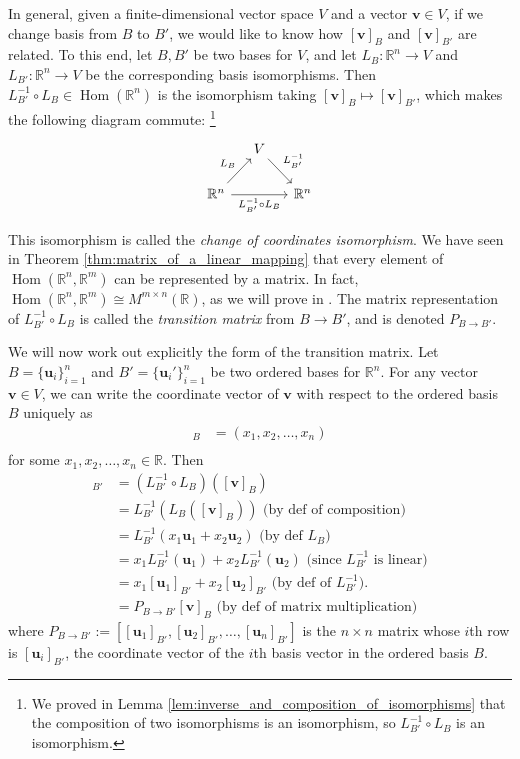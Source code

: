 \documentclass[12pt,letterpaper,reqno]{article}
\numberwithin{equation}{section}
\newcommand{\R}{\ensuremath{\mathbb R}}
\newcommand{\bv}{\mathbf{v}}
\newcommand{\bu}{\mathbf{u}}
\DeclareMathOperator{\Hom}{Hom}
\newcommand{\fixme}[1]{{\color{orange}{[#1]}}}
\begin{document}
In general, given a finite-dimensional vector space $V$ and a vector $\mathbf{v} \in V$, if we change basis from $B$ to $B'$, we would like to know how $[\mathbf{v}]_B$ and $[\mathbf{v}]_{B'}$ are related. To this end, let $B,B'$ be two bases for $V$, and let $L_B:\R^n \to V$ and $L_{B'}:\R^n \to V$  be the corresponding basis isomorphisms. Then $L_{B'}^{-1}\circ L_B \in \Hom(\R^n)$ is the isomorphism taking $[\mathbf{v}]_B \mapsto [\mathbf{v}]_{B'}$, which makes the following diagram commute: \footnote{We proved in Lemma \ref{lem:inverse_and_composition_of_isomorphisms} that the composition of two isomorphisms is an isomorphism, so $L_{B'}^{-1} \circ L_B$ is an isomorphism.}
\begin{equation*}
	\begin{tikzcd}[column sep=small]
& V \arrow[dl, leftarrow, swap,"L_B"] \arrow[dr, "L_{B'}^{-1}"] & \\
\R^n \arrow{rr}[swap]{L_{B'}^{-1} \circ L_B} & & \R^n
\end{tikzcd}	
\end{equation*}
\begin{defn}
This isomorphism is called the \emph{change of coordinates isomorphism}. We have seen in Theorem \ref{thm:matrix_of_a_linear_mapping} that every element of $\Hom(\R^n,\R^m)$ can be represented by a matrix. In fact, $\Hom(\R^n,\R^m)\cong M^{m \times n}(\R)$, as we will prove in \fixme{Add link.}. The matrix representation of $L_{B'}^{-1}\circ L_B$ is called the \emph{transition matrix} from $B \to B'$, and is denoted $P_{B \to B'}$.	
\end{defn}

We will now work out explicitly the form of the transition matrix. Let $B=\{\bu_i\}_{i=1}^n$ and $B'=\{\bu_i'\}_{i=1}^n$ be two ordered bases for $\R^n$. For any vector $\bv \in V$, we can write the coordinate vector of $\bv$ with respect to the ordered basis $B$ uniquely as 
\begin{align*}
	[\bv]_B&=(x_1,x_2,\dots,x_n) \\ 
\end{align*}
for some $x_1,x_2,\dots,x_n \in \R$. Then
\begin{align*}
	[\bv]_{B'}&=(L_{B'}^{-1} \circ L_B)([\bv]_B) \\
	&=L_{B'}^{-1}(L_B([\bv]_B)) \text{ (by def of composition)}\\
	&=L_{B'}^{-1}(x_1\bu_1+x_2\bu_2) \text{ (by def $L_B$)} \\
	&=x_1L_{B'}^{-1}(\bu_1)+x_2L_{B'}^{-1}(\bu_2) \text{ (since $L_{B'}^{-1}$ is linear)} \\
	&=x_1[\bu_1]_{B'}+x_2[\bu_2]_{B'} \text{ (by def of $L_{B'}^{-1}$).} \\
	&=P_{B \to B'}[\bv]_{B} \text{ (by def of matrix multiplication)}
\end{align*}	
where $P_{B \to B'}:=[[\bu_1]_{B'}, [\bu_2]_{B'},\dots,[\bu_n]_{B'}]$ is the $n \times n$ matrix whose $i$th row is $[\bu_i]_{B'}$, the coordinate vector of the $i$th basis vector in the ordered basis $B$.
\end{document}
